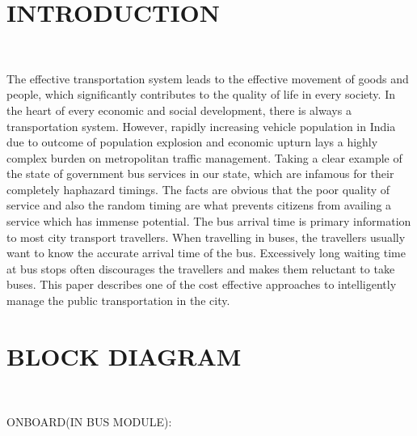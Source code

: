 \documentclass[12pt,a4paper,oneside]{report}
\begin{document}
\maketitle
\thispagestyle{empty}

\newpage




\begin{onehalfspacing}




\tableofcontents

\newpage
\section{INTRODUCTION}



{$\;\;\;\;$}
  
  The effective transportation system leads to the effective movement of goods and people, which significantly contributes to the quality of life in every society. In the heart of every economic and social development, there is always a transportation system. However, rapidly increasing vehicle population in India due to outcome of population explosion and economic upturn lays a highly complex burden on metropolitan traffic management.
   Taking a clear example of the state of government bus services in our state, which are infamous for their completely haphazard timings. The facts are obvious that the poor quality of service and also the random timing are what prevents citizens from availing a service which has immense potential.
  The bus arrival time is primary information to most city transport travellers. When travelling in buses, the travellers usually want to know the accurate arrival time of the bus. Excessively long waiting time at bus stops often discourages the travellers and makes them reluctant to take buses.
  This paper describes  one of the cost effective approaches to intelligently manage the public transportation in the city.


\newpage
\section{BLOCK DIAGRAM}
{$\;\;\;\;$}




ONBOARD(IN BUS MODULE):


\begin{figure}[h]


\end{figure}
\end{onehalfspacing}
\end{document}
